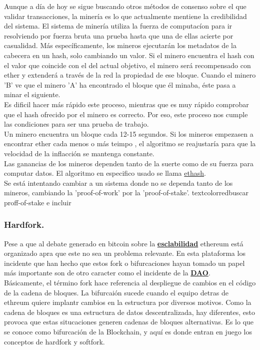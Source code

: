 \documentclass[11pt,a4paper]{article}
\begin{document}
Aunque a día de hoy se sigue buscando otros métodos de consenso sobre el que validar transacciones, la minería es lo que actualmente mentiene la credibilidad del sistema. El sistema de minería utiliza la fuerza de computacíon para ir resolviendo por fuerza bruta una prueba hasta que una de ellas acierte por casualidad. Más específicamente, los mineros ejecutarán los metadatos de la cabecera en un hash, solo cambiando un valor. Si el minero encuentra el hash con el valor que coincide con el del actual objetivo, el minero será recompensado con ether y extenderá a través de la red la propiedad de ese bloque. Cuando el minero 'B' ve que el minero 'A' ha encontrado el bloque que él minaba, éste pasa a minar el siguiente.\\

Es dificil hacer más rápido este proceso, mientras que es muy rápido comprobar que el hash ofrecido por el minero es correcto. Por eso, este proceso nos cumple las condiciones para ser una prueba de trabajo.\\

Un minero encuentra un bloque cada 12-15 segundos. Si los mineros empezasen a encontrar ether cada menos o más teimpo , el algoritmo se reajustaría para que la velocidad de la inflacción se mantenga constante.\\

Las ganancias de los mineros dependen tanto de la suerte como de su fuerza para computar datos. El algoritmo en especifico usado se llama \underline{ethash}. \\

Se está intentando cambiar a un sistema donde no se dependa tanto de los mineros, cambiando la 'proof-of-work' por la 'proof-of-stake'.
textcolor{red}{buscar proff-of-stake e incluir}\\

\subsubsection{Hardfork.}
Pese a que al debate generado en bitcoin sobre la \hyperref[sec:escalabilidad]{\textbf{\underline{esclabilidad}}} ethereum está organizado apra que este no sea un problema relevante. En esta plataforma los incidente que han hecho que estos fork o bifurcaciones hayan tomado un papel más importante son de otro caracter como el incidente de la \hyperref[sec:dao]{\textbf{\underline{DAO}}}.\\

Básicamente, el término fork hace referencia al despliegue de cambios en el código de la cadena de bloques. La bifurcaión sucede cuando el equipo detras de ethreum quiere implantr cambios en la estructura por diversos motivos. Como la cadena de bloques es una estructura de datos descentralizada, hay diferentes, esto provoca que estas situcaciones generen cadenas de bloques alternativas. Es lo que se conoce como bifurcación de la Blockchain, y aquí es donde entran en juego los conceptos de hardfork y softfork.\\
\end{document}
